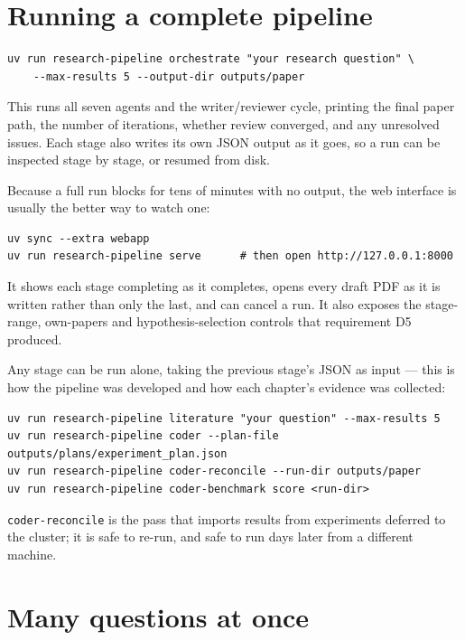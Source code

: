\section*{Running a complete pipeline}

\begin{lstlisting}[language={}]
uv run research-pipeline orchestrate "your research question" \
    --max-results 5 --output-dir outputs/paper
\end{lstlisting}

This runs all seven agents and the writer/reviewer cycle, printing the final
paper path, the number of iterations, whether review converged, and any
unresolved issues. Each stage also writes its own JSON output as it goes, so a
run can be inspected stage by stage, or resumed from disk.

Because a full run blocks for tens of minutes with no output, the web interface
is usually the better way to watch one:

\begin{lstlisting}[language={}]
uv sync --extra webapp
uv run research-pipeline serve      # then open http://127.0.0.1:8000
\end{lstlisting}

It shows each stage completing as it completes, opens every draft PDF as it is
written rather than only the last, and can cancel a run. It also exposes the
stage-range, own-papers and hypothesis-selection controls that requirement D5
produced.

Any stage can be run alone, taking the previous stage's JSON as input --- this
is how the pipeline was developed and how each chapter's evidence was collected:

\begin{lstlisting}[language={}]
uv run research-pipeline literature "your question" --max-results 5
uv run research-pipeline coder --plan-file outputs/plans/experiment_plan.json
uv run research-pipeline coder-reconcile --run-dir outputs/paper
uv run research-pipeline coder-benchmark score <run-dir>
\end{lstlisting}

\texttt{coder-reconcile} is the pass that imports results from experiments
deferred to the cluster; it is safe to re-run, and safe to run days later from a
different machine.

\section*{Many questions at once}

